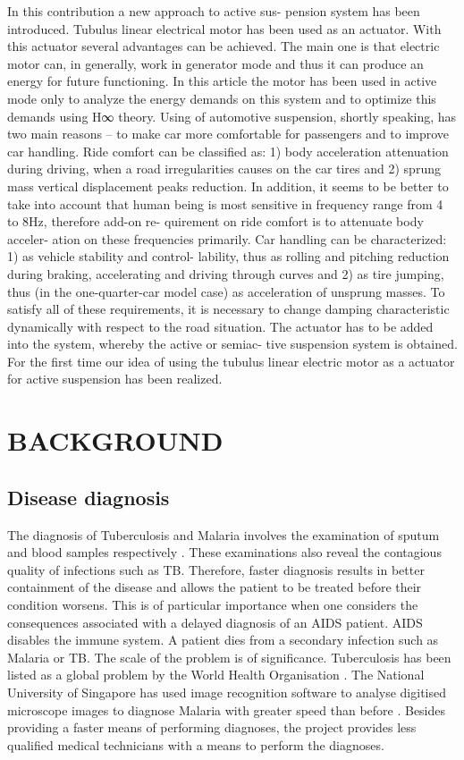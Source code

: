 \documentclass[10pt,twocolumn]{witseiepaper}
\begin{document}
In this contribution a new approach to active sus-
pension system has been introduced. Tubulus linear
electrical motor has been used as an actuator. With
this actuator several advantages can be achieved. The
main one is that electric motor can, in generally, work
in generator mode and thus it can produce an energy
for future functioning. In this article the motor has
been used in active mode only to analyze the energy
demands on this system and to optimize this demands
using H∞ theory.
Using of automotive suspension, shortly speaking, has
two main reasons – to make car more comfortable for
passengers and to improve car handling. Ride comfort
can be classified as: 1) body acceleration attenuation
during driving, when a road irregularities causes on
the car tires and 2) sprung mass vertical displacement
peaks reduction. In addition, it seems to be better to
take into account that human being is most sensitive
in frequency range from 4 to 8Hz, therefore add-on re-
quirement on ride comfort is to attenuate body acceler-
ation on these frequencies primarily. Car handling can
be characterized: 1) as vehicle stability and control-
lability, thus as rolling and pitching reduction during
braking, accelerating and driving through curves and
2) as tire jumping, thus (in the one-quarter-car model
case) as acceleration of unsprung masses.
To satisfy all of these requirements, it is necessary
to change damping characteristic dynamically with
respect to the road situation. The actuator has to be
added into the system, whereby the active or semiac-
tive suspension system is obtained. For the first time
our idea of using the tubulus linear electric motor as a
actuator for active suspension has been realized.
\section{BACKGROUND}

\subsection{Disease diagnosis}

The diagnosis of Tuberculosis and Malaria involves the examination of sputum
and blood samples respectively \cite{phppo,biotec,STimes}.  These examinations
also reveal the contagious quality of infections such as TB.  Therefore,
faster diagnosis results in better containment of the disease and allows the
patient to be treated before their condition worsens.  This is of particular
importance when one considers the consequences associated with a delayed
diagnosis of an AIDS patient.  AIDS disables the immune system.  A patient
dies from a secondary infection such as Malaria or TB.  The scale of the
problem is of significance.  Tuberculosis has been listed as a global problem
by the World Health Organisation \cite{biotec}.  The National University
of Singapore has used image recognition software to analyse digitised
microscope images to diagnose Malaria with greater speed than
before \cite{STimes}.  Besides providing a faster means of performing
diagnoses, the project provides less qualified medical technicians with a
means to perform the diagnoses.
\end{document}
